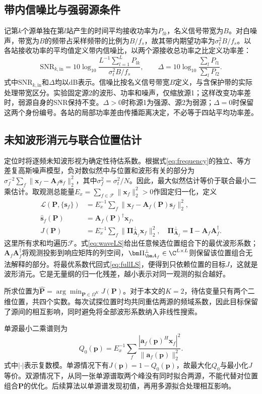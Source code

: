\subsection{带内信噪比与强弱源条件}
记第$k$个源单独在第$l$站产生的时间平均接收功率为$P_{lk}$，名义信号带宽为$B$。对白噪声，带宽为$B$的频带占采样频带的比例为$B/f_s$，故其带内期望功率为$\sigma_t^2B/f_s$。以各站接收功率的平均值定义带内信噪比，以两个源接收总功率之比定义功率差：
\begin{equation}
 \mathrm{SNR}_{k,\mathrm{in}}
 =10\log_{10}\frac{L^{-1}\sum_{l=1}^L P_{lk}}
 {\sigma_t^2B/f_s},\qquad
 \Delta=10\log_{10}\frac{\sum_l P_{l1}}{\sum_l P_{l2}} .
 \label{eq:snr}
\end{equation}
式中$\mathrm{SNR}_{k,\mathrm{in}}$和$\Delta$均以dB表示。信噪比按名义信号带宽$B$定义，与含保护带的实际处理带宽区分。实验固定源2的波形、功率和噪声，仅缩放源1；这样改变功率差时，弱源自身的SNR保持不变。$\Delta>0$时称源1为强源、源2为弱源；$\Delta=0$时保留这两个身份编号。各站的局部功率差由传播距离决定，不必等于四站平均功率差。

\subsection{未知波形消元与联合位置估计}
定位时将逐频未知波形视为确定性待估系数。根据式\eqref{eq:frequency}的独立、等方差复高斯噪声模型，负对数似然中与位置和波形有关的部分为$\sigma_f^{-2}\sum_f\|\bm x_f-\bm A_f\bm s_f\|_2^2$，其中$\sigma_f^2=\sigma_t^2/N$。因此，最大似然估计等价于联合最小二乘估计\cite{ChenHudsonYao2002}。取观测总能量$E_x=\sum_{f\in\mathcal F}\|\bm x_f\|_2^2>0$作固定归一化，定义
\begin{align}
 \mathcal L(\bm P,\{\bm s_f\})
   &=E_x^{-1}\sum_f\|\bm x_f-\bm A_f(\bm P)\bm s_f\|_2^2,\label{eq:fullLS}\\
 \widehat{\bm s}_f(\bm P)&=\bm A_f(\bm P)^\dagger\bm x_f,\label{eq:waveLS}\\
 J(\bm P)&=E_x^{-1}\sum_f\|\bm\Pi_{\bm A_f}^{\perp}\bm x_f\|_2^2,
 \quad \bm\Pi_{\bm A_f}^{\perp}=\bm I-\bm A_f\bm A_f^\dagger .\label{eq:profile}
\end{align}
这里所有求和均遍历$\mathcal F$。式\eqref{eq:waveLS}给出任意候选位置组合下的最优波形系数；$\bm A_f\bm A_f^\dagger$将观测投影到响应矩阵的列空间，$\bm\Pi_{\bm A_f}^{\perp}\in\C^{L\times L}$则保留该位置组合无法解释的部分。将最优系数代回式\eqref{eq:fullLS}，便得到只依赖位置的目标$J$，这就是波形消元\cite{GolubPereyra1973}。它是无量纲的归一化残差，越小表示对同一观测的拟合越好。

所求位置为$\widehat{\bm P}=\arg\min_{\bm P\in\Omega^K}J(\bm P)$。对于本文的$K=2$，待估变量只有两个二维位置，共四个实数。每次试探位置时均共同重估两源的频域系数，因此目标保留了源间的相互影响，同时避免将全部波形系数纳入非线性搜索。

单源最小二乘谱则为
\begin{equation}
 Q_0(\bm p)=E_x^{-1}\sum_f
 \frac{|\bm a_f(\bm p)^H\bm x_f|^2}{\|\bm a_f(\bm p)\|_2^2} .\label{eq:single}
\end{equation}
式中$|\cdot|$表示复数模。单源情况下有$J(\bm p)=1-Q_0(\bm p)$，故最大化$Q_0$与最小化$J$等价。双源情况下，从同一张单源谱取两个峰没有同时拟合两源，不能代替对位置组合$\bm P$的优化。后续算法以单源谱发现初值，再用多源拟合处理相互影响。
